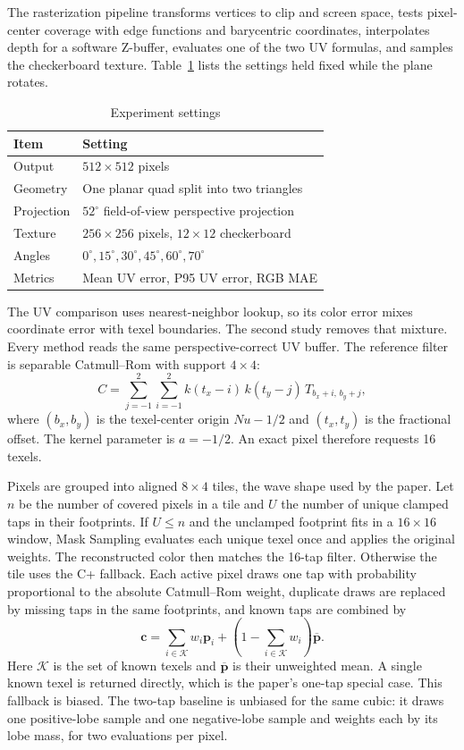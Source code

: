 \documentclass[a4paper,11pt]{article}
\begin{document}
The rasterization pipeline transforms vertices to clip and screen space, tests pixel-center coverage with edge functions and barycentric coordinates, interpolates depth for a software Z-buffer, evaluates one of the two UV formulas, and samples the checkerboard texture. Table~\ref{tab:settings} lists the settings held fixed while the plane rotates.

\begin{table}[H]
\centering
\caption{Experiment settings}
\label{tab:settings}
\begin{tabular}{ll}
\toprule
Item & Setting \\
\midrule
Output & $512\times512$ pixels \\
Geometry & One planar quad split into two triangles \\
Projection & $52^\circ$ field-of-view perspective projection \\
Texture & $256\times256$ pixels, $12\times12$ checkerboard \\
Angles & $0^\circ,15^\circ,30^\circ,45^\circ,60^\circ,70^\circ$ \\
Metrics & Mean UV error, P95 UV error, RGB MAE \\
\bottomrule
\end{tabular}
\end{table}

The UV comparison uses nearest-neighbor lookup, so its color error mixes coordinate error with texel boundaries. The second study removes that mixture. Every method reads the same perspective-correct UV buffer. The reference filter is separable Catmull--Rom with support $4\times4$:
\begin{equation}
C=\sum_{j=-1}^{2}\sum_{i=-1}^{2} k(t_x-i)\,k(t_y-j)\,T_{b_x+i,\,b_y+j},
\end{equation}
where $(b_x,b_y)$ is the texel-center origin $Nu-1/2$ and $(t_x,t_y)$ is the fractional offset. The kernel parameter is $a=-1/2$. An exact pixel therefore requests 16 texels.

Pixels are grouped into aligned $8\times4$ tiles, the wave shape used by the paper. Let $n$ be the number of covered pixels in a tile and $U$ the number of unique clamped taps in their footprints. If $U\le n$ and the unclamped footprint fits in a $16\times16$ window, Mask Sampling evaluates each unique texel once and applies the original weights. The reconstructed color then matches the 16-tap filter. Otherwise the tile uses the C+ fallback. Each active pixel draws one tap with probability proportional to the absolute Catmull--Rom weight, duplicate draws are replaced by missing taps in the same footprints, and known taps are combined by
\begin{equation}
\mathbf{c}=\sum_{i\in\mathcal{K}} w_i\mathbf{p}_i+\left(1-\sum_{i\in\mathcal{K}} w_i\right)\overline{\mathbf{p}}.
\end{equation}
Here $\mathcal{K}$ is the set of known texels and $\overline{\mathbf{p}}$ is their unweighted mean. A single known texel is returned directly, which is the paper's one-tap special case. This fallback is biased. The two-tap baseline is unbiased for the same cubic: it draws one positive-lobe sample and one negative-lobe sample and weights each by its lobe mass, for two evaluations per pixel.
\end{document}
